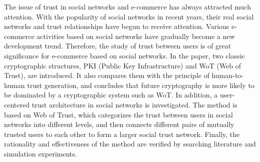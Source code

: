 The issue of trust in social networks and e-commerce has always attracted much attention.
With the popularity of social networks in recent years, their real social networks and 
trust relationships have begun to receive attention. Various e-commerce activities 
based on social networks have gradually become a new development trend. Therefore, the 
study of trust between users is of great significance for e-commerce based on social networks.
In the paper, two classic cryptographic structures, PKI (Public Key Infrastructure) and 
WoT (Web of Trust), are introduced. It also compares them with the principle of human-to-human 
trust generation, and concludes that future cryptography is more likely to be dominated by 
a cryptographic system such as WoT. In addition, a user-centered trust architecture in social 
networks is investigated. The method is based on Web of Trust, which categorizes the trust 
between users in social networks into different levels, and then connects different pairs 
of mutually trusted users to each other to form a larger social trust network. Finally, 
the rationality and effectiveness of the method are verified by searching literature and 
simulation experiments.